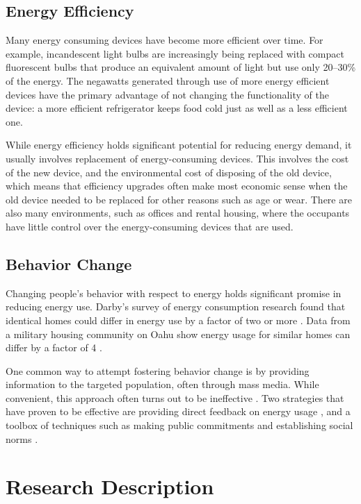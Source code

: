 \subsection{Energy Efficiency}

Many energy consuming devices have become more efficient over time. For example, incandescent light bulbs are increasingly being replaced with compact fluorescent bulbs that produce an equivalent amount of light but use only 20--30\% of the energy. The negawatts generated through use of more energy efficient devices have the primary advantage of not changing the functionality of the device: a more efficient refrigerator keeps food cold just as well as a less efficient one.

While energy efficiency holds significant potential for reducing energy demand, it usually involves replacement of energy-consuming devices. This involves the cost of the new device, and the environmental cost of disposing of the old device, which means that efficiency upgrades often make most economic sense when the old device needed to be replaced for other reasons such as age or wear. There are also many environments, such as offices and rental housing, where the occupants have little control over the energy-consuming devices that are used.

\subsection{Behavior Change}

Changing people's behavior with respect to energy holds significant promise in reducing energy use. Darby's survey of energy consumption research found that identical homes could differ in energy use by a factor of two or more \cite{darby-review-2006}. Data from a military housing community on Oahu show energy usage for similar homes can differ by a factor of 4 \cite{Norton2010ZeroEnergyHomes}.

One common way to attempt fostering behavior change is by providing information to the targeted population, often through mass media. While convenient, this approach often turns out to be ineffective \cite{McKenzie-Mohr2009}. Two strategies that have proven to be effective are providing direct feedback on energy usage \cite{darby-review-2006}, and a toolbox of techniques such as making public commitments and establishing social norms \cite{McKenzie-Mohr2009}. 


\section{Research Description}

